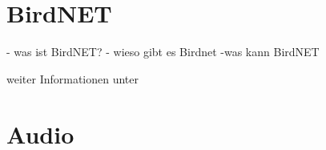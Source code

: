 \section{BirdNET}
- was ist BirdNET?
- wieso gibt es Birdnet
-was kann BirdNET

weiter Informationen unter \cite{kahl2021birdnet}



\section{Audio}



